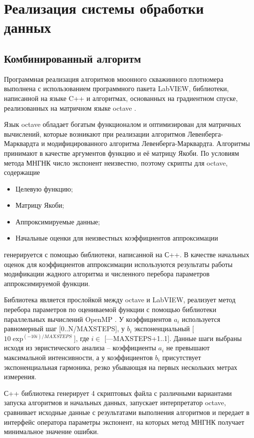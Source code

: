 \chapter{Реализация системы обработки данных} \label{chapt3}

\section{Комбинированный алгоритм}
Программная реализация алгоритмов мюонного скважинного плотномера выполнена с использованием 
программного пакета LabVIEW, библиотеки, написанной на языке C++ и алгоритмах, основанных на 
градиентном спуске, реализованных на матричном языке octave \cite{straustrup, octave}. 

Язык octave обладает богатым функционалом и оптимизирован для 
матричных вычислений, которые возникают при реализации алгоритмов 
Левенберга-Марквардта и модифицированного алгоритма 
Левенберга-Марквардта. Алгоритмы принимают в качестве аргументов 
функцию и её матрицу Якоби. По условиям метода МНГНК число 
экспонент неизвестно, поэтому скрипты для octave, содержащие
\begin{itemize}
\item Целевую функцию;
\item Матрицу Якоби;
\item Аппроксимируемые данные;
\item Начальные оценки для неизвестных коэффициентов аппроксимации 
\end{itemize} 
генерируется с помощью библиотеки, написанной на С++. В качестве 
начальных оценок для коэффициентов аппроксимации используются 
результаты работы модификации жадного алгоритма и численного 
перебора параметров аппроксимируемой функции. 

Библиотека является прослойкой между octave и LabVIEW, реализует 
метод перебора параметров по оцениваемой функции с помощью библиотеки параллельных вычислений OpenMP \cite{openmp}. У коэффициентов $a_i$ используется равномерный шаг [0..N/MAXSTEPS], у $b_i$ экспоненциальный [$10 \exp^{(-10 i)/MAXSTEPS} $], где $i \in $
[---MAXSTEPS+1..1]. Данные шаги выбраны исходя из эвристического 
анализа -- коэффициенты $a_i$ не превышают максимальной 
интенсивности, а у коэффициентов $b_i$ присутствует 
экспоненциальная гармоника, резко убывающая на первых нескольких 
метрах измерения.

С++ библиотека генерирует 4 скриптовых файла с различными 
вариантами запуска алгоритмов и начальных данных, запускает интерпретатор octave, сравнивает 
исходные данные с результатами выполнения алгоритмов и передает в интерфейс 
оператора параметры экспонент, на которых метод МНГНК получает минимальное значение ошибки.


